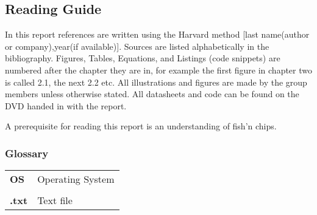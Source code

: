 \subsection*{Reading Guide}
\label{sub:reading_guide}

In this report references are written using the Harvard method [last name(author or company),year(if available)].
Sources are listed alphabetically in the bibliography.
Figures, Tables, Equations, and Listings (code snippets) are numbered after the chapter they are in,
for example the first figure in chapter two is called 2.1, the next 2.2 etc.
All illustrations and figures are made by the group members unless otherwise stated.
All datasheets and code can be found on the DVD handed in with the report.

A prerequisite for reading this report is an understanding of fish'n chips.

\subsubsection{Glossary}
\begin{longtable}{l p{12cm}}
\textbf{OS}			& \qquad \qquad Operating System\\
					& \\
\textbf{.txt}		& \qquad \qquad Text file\\

\end{longtable}
